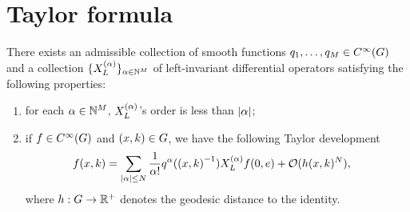 \section{Taylor formula}

\begin{proposition}
    There exists an admissible collection of smooth functions $q_1, \dots, q_M \in {C^\infty(G)}$
    and a collection $\{X^{(\alpha)}_L\}_{\alpha \in \mathbb{N}^M}$ of left-invariant differential operators satisfying the following properties:
    \begin{enumerate}
        \item for each $\alpha \in \mathbb{N}^M$, $X^{(\alpha)}_L$'s order is less than $\left|{\alpha}\right|$;
        \item if $f \in {C^\infty(G)}$ and $(x, k) \in G$,
            we have the following Taylor development
            \begin{align*}
                f(x, k) &= \sum_{\left|{\alpha}\right| \leq N} \frac{1}{\alpha!} q^\alpha({(x, k)}^{-1}) X^{(\alpha)}_L f(0, e) + \mathcal{O}(h(x, k)^N),
            \end{align*}
            where $h : G \to \mathbb{R}^+$ denotes the geodesic distance to the identity.
    \end{enumerate}
\end{proposition}
